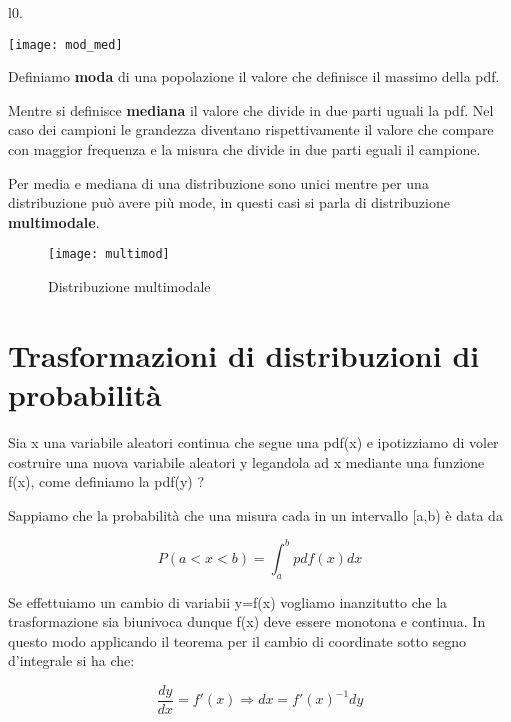 \documentclass[11pt,a4paper]{book}
\begin{document}
\begin{wrapfigure}[8]{l}{0.\textwidth}

\centering

\texttt{[image: mod\_med]}	

\end{wrapfigure}


\noindent Definiamo \textbf{moda} di una popolazione il valore che definisce il massimo della pdf. \newline

\noindent Mentre si definisce \textbf{mediana} il valore che  divide in due parti uguali la pdf. Nel caso dei campioni le grandezza diventano rispettivamente il valore che compare con maggior frequenza e la misura che divide in due parti eguali il campione.

Per media e mediana di una distribuzione sono unici mentre per una distribuzione pu\`{o} avere pi\`{u} mode, in questi casi si parla di distribuzione \textbf{multimodale}.

 
\begin{figure}[ht]
\vspace{0.3in}
\texttt{[image: multimod]}	
\centering
\vspace{0.3in}
\caption{Distribuzione multimodale}
\end{figure}

\section{Trasformazioni di distribuzioni di probabilit\`{a}}

Sia x una variabile aleatori continua  che segue una pdf(x) e ipotizziamo di voler costruire una nuova variabile aleatori y legandola ad x mediante una funzione f(x), come definiamo la pdf(y) ?

Sappiamo che la probabilit\`{a} che una misura cada in un intervallo [a,b) \`{e} data da 

\begin{equation*}
	P(a < x< b) = \int_{a}^{b}{pdf(x)dx}
\end{equation*}
\newline

Se effettuiamo un cambio di variabii y=f(x) vogliamo inanzitutto che la trasformazione sia biunivoca dunque f(x) deve essere monotona e continua. In questo modo applicando il teorema per il cambio di coordinate sotto segno d'integrale si ha che:

\begin{equation}
	\dfrac{dy}{dx} = f'(x) \Rightarrow dx = f'(x)^{-1}dy
\end{equation}
\end{document}
